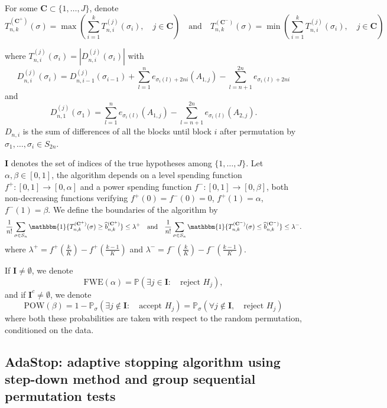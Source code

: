 \documentclass{article}
\theoremstyle{plain}
\theoremstyle{remark}
\renewcommand{\P}{\mathbb{P}}
\newcommand{\1}{\mathbbm{1}}
\numberwithin{equation}{section}
\begin{document}
For some $\textbf{C} \subset \{1,\dots,J\}$, denote
$$T_{n,k}^{(\textbf{C}^+)}(\sigma)= \max\left(\sum_{i=1}^kT_{n,i}^{(j)}(\sigma_i),\quad j \in \textbf{C}\right) \quad \text{and}\quad T_{n,k}^{(\textbf{C}^-)}(\sigma)= \min\left(\sum_{i=1}^kT_{n,i}^{(j)}(\sigma_i),\quad j \in \textbf{C}\right)$$

where $T_{n,i}^{(j)}(\sigma_i)= |D_{n,i}^{(j)}(\sigma_i)|$ with
$$D_{n,i}^{(j)}(\sigma_i)= D_{n,i-1}^{(j)}(\sigma_{i-1})+\sum_{l=1}^{n} e_{\sigma_i(l)+2ni}(A_{1,j})-\sum_{l=n+1}^{2n} e_{\sigma_i(l)+2ni} $$
and 
$$D_{n,1}^{(j)}(\sigma_1)=\sum_{l=1}^{n} e_{\sigma_i(l)}(A_{1,j})-\sum_{l=n+1}^{2n} e_{\sigma_i(l)}(A_{2,j}).$$
$D_{n,i}$ is the sum of differences of all the blocks until block $i$ after permutation by $\sigma_1,\dots,\sigma_i\in S_{2n}$.
 
$\textbf{I}$ denotes the set of indices of the true hypotheses among $\{1,\dots,J\}$. Let $\alpha, \beta \in [0,1]$, the algorithm depends on a level spending function $f^+:[0,1]\to[0,\alpha]$ and a power spending function $f^-:[0,1]\to [0,\beta]$, both non-decreasing functions verifying $f^+(0)=f^-(0)=0$, $f^+(1)=\alpha$, $f^-(1)=\beta$. We define the boundaries of the algorithm by 
$$\frac{1}{n!}\sum_{\sigma \in S_n} \1\{T_{n,k}^{(\textbf{C}^+)}(\sigma) \ge  \widehat{b}_{n,k}^{(\textbf{C}^+)}\} \le  \lambda^+ \quad \text{and}\quad \frac{1}{n!}\sum_{\sigma \in S_n} \1\{T_{n,k}^{(\textbf{C}^-)}(\sigma) \leq   \widehat{b}_{n,k}^{(\textbf{C}^-)}\} \le  \lambda^- .$$
where $\lambda^+ = f^+ \left(\frac{k}{K}\right)- f^+ \left( \frac{k-1}{K}\right)$ and $\lambda^- = f^- \left(\frac{k}{K}\right)- f^- \left( \frac{k-1}{K}\right)$.

If $\textbf{I} \neq \emptyset$, we denote 
$$\mathrm{FWE}(\alpha) = \P\left(\exists j \in \textbf{I}:\quad  \text{reject }H_j \right),$$
and if $\textbf{I}^c \neq \emptyset$, we denote 
$$\mathrm{POW}(\beta) =  1-\P_\sigma\left(\exists j \notin \textbf{I}:\quad  \text{accept }H_j \right)= \P_\sigma\left(\forall j \notin \textbf{I}, \quad \text{reject }H_j\right) $$
where both these probabilities are taken with respect to the random permutation, conditioned on the data.
\subsection{AdaStop: adaptive stopping algorithm using step-down method and group sequential permutation tests}
\end{document}
